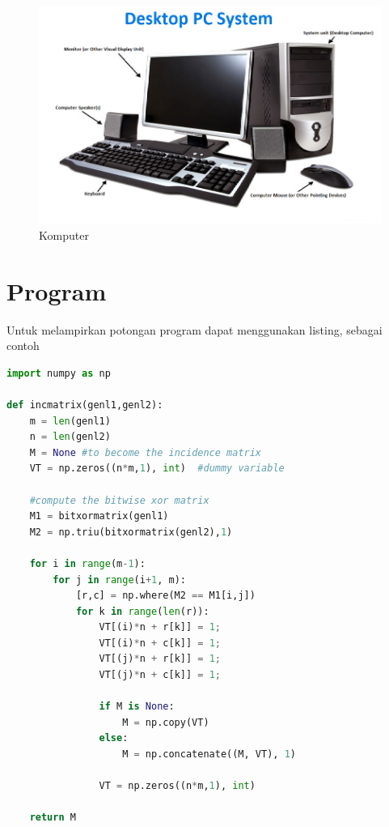 \begin{figure}[H]
    \centering
    \includegraphics[scale=.2]{gambar/contoh-gambar-miring.png}
    \caption{Komputer}
    \label{fig:komputer}
\end{figure}


\section{Program}
\noindent Untuk melampirkan potongan program dapat menggunakan listing, sebagai contoh

\begin{lstlisting}[language=Python,caption={Program perhitungan bilangan prima}, label={lst:bilanganprima}]
import numpy as np

def incmatrix(genl1,genl2):
    m = len(genl1)
    n = len(genl2)
    M = None #to become the incidence matrix
    VT = np.zeros((n*m,1), int)  #dummy variable

    #compute the bitwise xor matrix
    M1 = bitxormatrix(genl1)
    M2 = np.triu(bitxormatrix(genl2),1)

    for i in range(m-1):
        for j in range(i+1, m):
            [r,c] = np.where(M2 == M1[i,j])
            for k in range(len(r)):
                VT[(i)*n + r[k]] = 1;
                VT[(i)*n + c[k]] = 1;
                VT[(j)*n + r[k]] = 1;
                VT[(j)*n + c[k]] = 1;

                if M is None:
                    M = np.copy(VT)
                else:
                    M = np.concatenate((M, VT), 1)

                VT = np.zeros((n*m,1), int)

    return M
\end{lstlisting}

